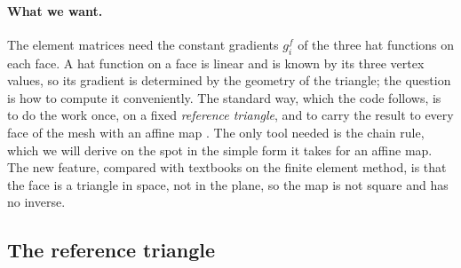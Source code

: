 \paragraph{What we want.} The element matrices need the constant gradients $g_i^f$ of the three hat functions on each face. A hat function on a face is linear and is known by its three vertex values, so its gradient is determined by the geometry of the triangle; the question is how to compute it conveniently. The standard way, which the code follows, is to do the work once, on a fixed \emph{reference triangle}, and to carry the result to every face of the mesh with an affine map \cite{Sayas2015}. The only tool needed is the chain rule, which we will derive on the spot in the simple form it takes for an affine map. The new feature, compared with textbooks on the finite element method, is that the face is a triangle in space, not in the plane, so the map is not square and has no inverse.

\subsection{The reference triangle}

